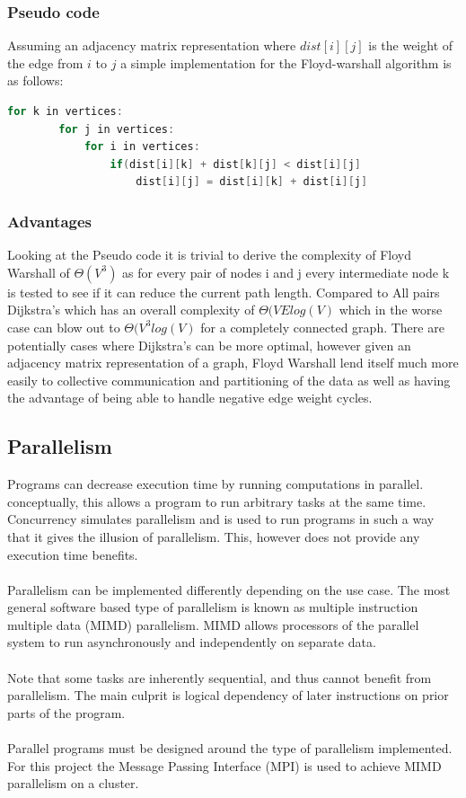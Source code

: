 \documentclass[12pt]{article}
\begin{document}
\subsubsection{Pseudo code}

Assuming an adjacency matrix representation where $dist[i][j]$ is the weight of the edge from $i$ to $j$ a simple implementation for the Floyd-warshall algorithm is as follows:

\begin{lstlisting}[language=c, caption=Distributed example]
    for k in vertices:
        for j in vertices:
            for i in vertices:
                if(dist[i][k] + dist[k][j] < dist[i][j] 
                    dist[i][j] = dist[i][k] + dist[i][j]
\end{lstlisting}

\subsubsection{Advantages}

Looking at the Pseudo code it is trivial to derive the complexity of Floyd Warshall of \(\Theta (V^3)\) as for every pair of nodes i and j every intermediate node k is tested to see if it can reduce the current path length. Compared to All pairs Dijkstra's which has an overall complexity of \(\Theta (VElog(V)\) which in the worse case can blow out to \(\Theta (V^3log(V)\) \cite{Cormen:2009:IAT:1614191} for a completely connected graph. There are potentially cases where Dijkstra's can be more optimal, however given an adjacency matrix representation of a graph, Floyd Warshall lend itself much more easily to collective communication and partitioning of the data as well as having the advantage of being able to handle negative edge weight cycles. 

\subsection{Parallelism}
Programs can decrease execution time by running computations in parallel. conceptually, this allows a program to run arbitrary tasks at the same time. Concurrency simulates parallelism and is used to run programs in such a way that it gives the illusion of parallelism. This, however does not provide any execution time benefits. 
\\\\
Parallelism can be implemented differently depending on the use case. The most general software based type of parallelism is known as multiple instruction multiple data (MIMD) parallelism. MIMD allows processors of the parallel system to run asynchronously and independently on separate data.  
\\\\
Note that some tasks are inherently sequential, and thus cannot benefit from parallelism. The main culprit is logical dependency of later instructions on prior parts of the program.
\\\\
Parallel programs must be designed around the type of parallelism implemented. For this project the Message Passing Interface (MPI) is used to achieve MIMD parallelism on a cluster.
\end{document}
